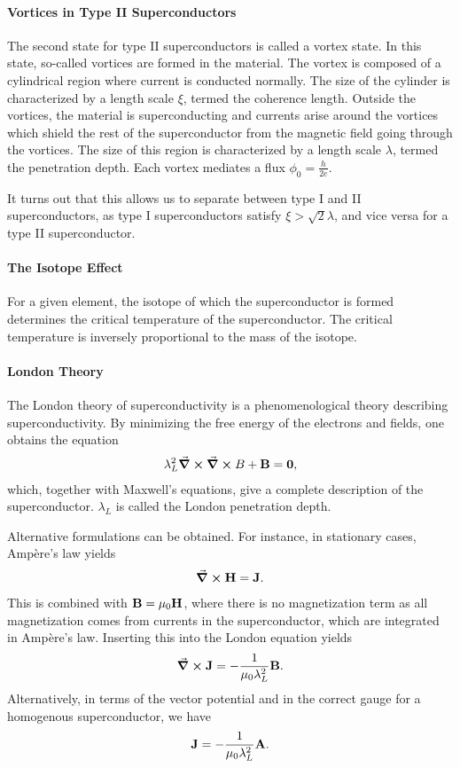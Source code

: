 \paragraph{Vortices in Type II Superconductors}
The second state for type II superconductors is called a vortex state. In this state, so-called vortices are formed in the material. The vortex is composed of a cylindrical region where current is conducted normally. The size of the cylinder is characterized by a length scale $\xi$, termed the coherence length. Outside the vortices, the material is superconducting and currents arise around the vortices which shield the rest of the superconductor from the magnetic field going through the vortices. The size of this region is characterized by a length scale $\lambda$, termed the penetration depth. Each vortex mediates a flux $\phi_{0} = \frac{h}{2e}$.

It turns out that this allows us to separate between type I and II superconductors, as type I superconductors satisfy $\xi > \sqrt{2}\lambda$, and vice versa for a type II superconductor.

\paragraph{The Isotope Effect}
For a given element, the isotope of which the superconductor is formed determines the critical temperature of the superconductor. The critical temperature is inversely proportional to the mass of the isotope.

\paragraph{London Theory}
The London theory of superconductivity is a phenomenological theory describing superconductivity. By minimizing the free energy of the electrons and fields, one obtains the equation
\begin{align*}
	\lambda_{L}^{2}\curl{\curl{B}} + \vb{B} = \vb{0},
\end{align*}
which, together with Maxwell's equations, give a complete description of the superconductor. $\lambda_{L}$ is called the London penetration depth.

Alternative formulations can be obtained. For instance, in stationary cases, Ampère's law yields
\begin{align*}
	\curl{\vb{H}} = \vb{J}.
\end{align*}
This is combined with $\vb{B} = \mu_{0}\vb{H}$, where there is no magnetization term as all magnetization comes from currents in the superconductor, which are integrated in Ampère's law. Inserting this into the London equation yields
\begin{align*}
	\curl{\vb{J}} = -\frac{1}{\mu_{0}\lambda_{L}^{2}}\vb{B}.
\end{align*}
Alternatively, in terms of the vector potential and in the correct gauge for a homogenous superconductor, we have
\begin{align*}
	\vb{J} = -\frac{1}{\mu_{0}\lambda_{L}^{2}}\vb{A}.
\end{align*}

